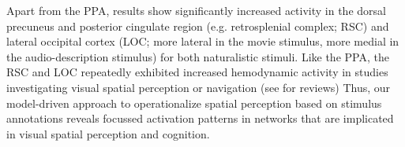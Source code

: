 \documentclass[english]{article}
\begin{document}

Apart from the PPA, results show significantly increased activity in the dorsal
precuneus and posterior cingulate region (e.g. retrosplenial complex; RSC) and
lateral occipital cortex (LOC; more lateral in the movie stimulus, more medial
in the audio-description stimulus) for both naturalistic stimuli.
Like the PPA, the RSC and LOC repeatedly exhibited increased hemodynamic
activity in studies investigating visual spatial perception or navigation (see
\citep{chrastil2018heterogeneity, bettencourt2013role} for reviews)
Thus, our model-driven approach to operationalize spatial perception based on
stimulus annotations reveals focussed activation patterns in networks that are
implicated in visual spatial perception and cognition.
\end{document}

